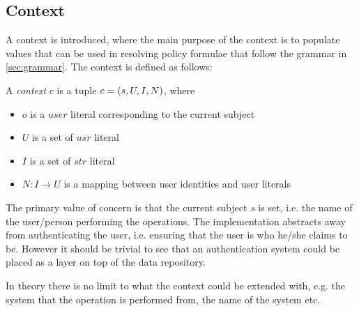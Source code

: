 \subsection{Context}
A context is introduced, where the main purpose of the context is to populate values that can be used in resolving policy formulae that follow the grammar in \autoref{sec:grammar}. The context is defined as follows:
\begin{definition}[Context]
A \emph{context} $c$ is a tuple $c = \left( s, U, I, N \right)$, where
\begin{itemize}
    \item $o$ is a $user$ literal corresponding to the current subject
    \item $U$ is a set of $usr$ literal
    \item $I$ is a set of $str$ literal
    \item $N : I \rightarrow U$ is a mapping between user identities and user literals
\end{itemize}
\end{definition}
The primary value of concern is that the current subject $s$ is set, i.e. the name of the user/person performing the operations. The implementation abstracts away from authenticating the user, i.e. ensuring that the user is who he/she claims to be. However it should be trivial to see that an authentication system could be placed as a layer on top of the data repository.

In theory there is no limit to what the context could be extended with, e.g. the system that the operation is performed from, the name of the system etc.



